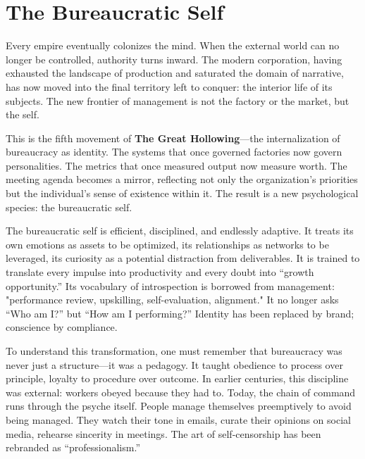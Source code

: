 \documentclass[11pt,twoside]{book}
\begin{document}
\chapter{The Bureaucratic Self}
\label{ch:05}

Every empire eventually colonizes the mind.  
When the external world can no longer be controlled, authority turns inward.  
The modern corporation, having exhausted the landscape of production and saturated the domain of narrative, has now moved into the final territory left to conquer: the interior life of its subjects.  The new frontier of management is not the factory or the market, but the self.  

This is the fifth movement of \textbf{The Great Hollowing}—the internalization of bureaucracy as identity.  The systems that once governed factories now govern personalities.  The metrics that once measured output now measure worth.  The meeting agenda becomes a mirror, reflecting not only the organization’s priorities but the individual’s sense of existence within it.  The result is a new psychological species: the bureaucratic self.

The bureaucratic self is efficient, disciplined, and endlessly adaptive.  It treats its own emotions as assets to be optimized, its relationships as networks to be leveraged, its curiosity as a potential distraction from deliverables.  It is trained to translate every impulse into productivity and every doubt into “growth opportunity.”  Its vocabulary of introspection is borrowed from management: "performance review, upskilling, self-evaluation, alignment."  It no longer asks “Who am I?” but “How am I performing?”  Identity has been replaced by brand; conscience by compliance.

To understand this transformation, one must remember that bureaucracy was never just a structure—it was a pedagogy.  It taught obedience to process over principle, loyalty to procedure over outcome.  In earlier centuries, this discipline was external: workers obeyed because they had to.  Today, the chain of command runs through the psyche itself.  People manage themselves preemptively to avoid being managed.  They watch their tone in emails, curate their opinions on social media, rehearse sincerity in meetings.  The art of self-censorship has been rebranded as “professionalism.”
\end{document}
